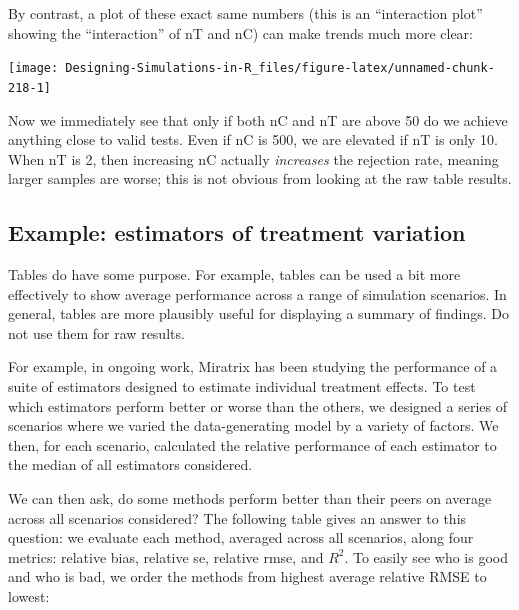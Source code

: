 \documentclass[
]{book}
\begin{document}
By contrast, a plot of these exact same numbers (this is an ``interaction plot'' showing the ``interaction'' of nT and nC) can make trends much more clear:

\begin{center}\texttt{[image: Designing-Simulations-in-R\_files/figure-latex/unnamed-chunk-218-1]} \end{center}

Now we immediately see that only if both nC and nT are above 50 do we achieve anything close to valid tests.
Even if nC is 500, we are elevated if nT is only 10. When nT is 2, then increasing nC actually \emph{increases} the rejection rate, meaning larger samples are worse; this is not obvious from looking at the raw table results.

\subsection{Example: estimators of treatment variation}\label{example-estimators-of-treatment-variation}

Tables do have some purpose.
For example, tables can be used a bit more effectively to show average performance across a range of simulation scenarios.
In general, tables are more plausibly useful for displaying a summary of findings. Do not use them for raw results.

For example, in ongoing work, Miratrix has been studying the performance of a suite of estimators designed to estimate individual treatment effects.
To test which estimators perform better or worse than the others, we designed a series of scenarios where we varied the data-generating model by a variety of factors.
We then, for each scenario, calculated the relative performance of each estimator to the median of all estimators considered.

We can then ask, do some methods perform better than their peers on average across all scenarios considered?
The following table gives an answer to this question: we evaluate each method, averaged across all scenarios, along four metrics: relative bias, relative se, relative rmse, and \(R^2\).
To easily see who is good and who is bad, we order the methods from highest average relative RMSE to lowest:
\end{document}
